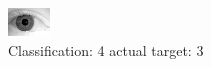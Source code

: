 \begin{figure}[h!]
\begin{center}
\includegraphics[width=0.60\columnwidth]{figures/ID2203_class_4_target_3.png}
\end{center}
\caption{ Classification: 4 actual target: 3}
\label{fig:ID2203_class_4_target_3}
\end{figure}
